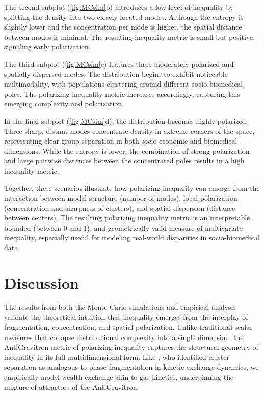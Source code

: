 \documentclass[11pt]{article}
\begin{document}
The second subplot (\ref{fig:MCsim}b) introduces a low level of inequality by splitting the density into two closely located modes. Although the entropy is slightly lower and the concentration per mode is higher, the spatial distance between modes is minimal. The resulting inequality metric is small but positive, signaling early polarization.

The third subplot (\ref{fig:MCsim}c) features three moderately polarized and spatially dispersed modes. The distribution begins to exhibit noticeable multimodality, with populations clustering around different socio-biomedical poles. The polarizing inequality metric increases accordingly, capturing this emerging complexity and polarization.

In the final subplot (\ref{fig:MCsim}d), the distribution becomes highly polarized. Three sharp, distant modes concentrate density in extreme corners of the space, representing clear group separation in both socio-economic and biomedical dimensions. While the entropy is lower, the combination of strong polarization and large pairwise distances between the concentrated poles results in a high inequality metric.

Together, these scenarios illustrate how polarizing inequality can emerge from the interaction between modal structure (number of modes), local polarization (concentration and sharpness of clusters), and spatial dispersion (distance between centers). The resulting polarizing inequality metric is an interpretable, bounded (between 0 and 1), and geometrically valid measure of multivariate inequality, especially useful for modeling real-world disparities in socio-biomedical data.



\section{Discussion}

The results from both the Monte Carlo simulations and empirical analysis validate the theoretical intuition that inequality emerges from the interplay of fragmentation, concentration, and spatial polarization. Unlike traditional scalar measures that collapse distributional complexity into a single dimension, the AntiGravitron metric of polarizing inequality captures the structural geometry of inequality in its full multidimensional form. Like \citet{chatterjee2007kinetic}, who identified cluster separation as analogous to phase fragmentation in kinetic-exchange dynamics, we  empirically model wealth exchange akin to gas kinetics, underpinning the mixture-of-attractors of the AntiGravitron.
\end{document}
